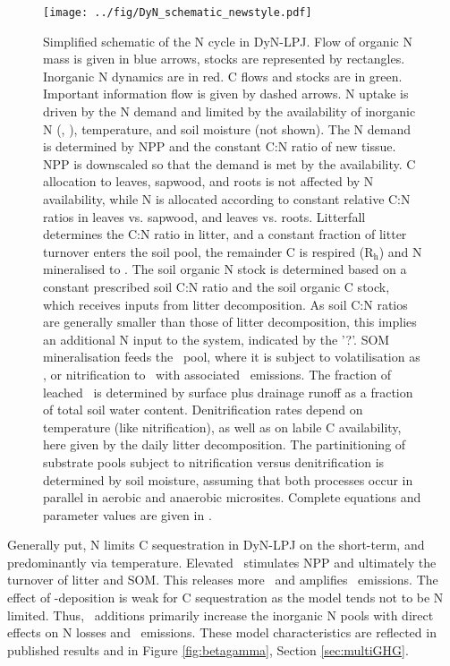 \begin{figure}[ht!]
\begin{center}
  \texttt{[image: ../fig/DyN\_schematic\_newstyle.pdf]}
\end{center}
  \caption[Simplified schematic of the N cycle in DyN-LPJ]{Simplified schematic of the N cycle in DyN-LPJ. Flow of organic N mass is given in blue arrows, stocks are represented by rectangles. Inorganic N dynamics are in red. C flows and stocks are in green. Important information flow is given by dashed arrows. N uptake is driven by the N demand and limited by the availability of inorganic N (\nhhhh , \nooo ), temperature, and soil moisture (not shown). The N demand is determined by NPP and the constant C:N ratio of new tissue. NPP is downscaled so that the demand is met by the availability. C allocation to leaves, sapwood, and roots is not affected by N availability, while N is allocated according to constant relative C:N ratios in leaves vs. sapwood, and leaves vs. roots. Litterfall determines the C:N ratio in litter, and a constant fraction of litter turnover enters the soil pool, the remainder C is respired (R$_{\text{h}}$) and N mineralised to \nhhhh . The soil organic N stock is determined based on a constant prescribed soil C:N ratio and the soil organic C stock, which receives inputs from litter decomposition. As soil C:N ratios are generally smaller than those of litter decomposition, this implies an additional N input to the system, indicated by the '?'. SOM mineralisation feeds the \nhhhh\ pool, where it is subject to volatilisation as \nhhh , or nitrification to \nooo\ with associated \nno\ emissions. The fraction of leached \nooo\ is determined by surface plus drainage runoff as a fraction of total soil water content. Denitrification rates depend on temperature (like nitrification), as well as on labile C availability, here given by the daily litter decomposition. The partinitioning of substrate pools subject to nitrification versus denitrification is determined by soil moisture, assuming that both processes occur in parallel in aerobic and anaerobic microsites. Complete equations and parameter values are given in \citet{xuri08gcb}.}
\label{fig:dyn}
\end{figure}

Generally put, N limits C sequestration in DyN-LPJ on the short-term, and predominantly via temperature. Elevated \coo\ stimulates NPP and ultimately the turnover of litter and SOM. This releases more \nr\ and amplifies \nno\ emissions. The effect of \nr -deposition is weak for C sequestration as the model tends not to be N limited. Thus, \nr\ additions primarily increase the inorganic N pools with direct effects on N losses and \nno\ emissions. These model characteristics are reflected in published results \citep{xuri12nphyt, stocker13natcc} and in Figure \ref{fig:betagamma}, Section \ref{sec:multiGHG}. \\


